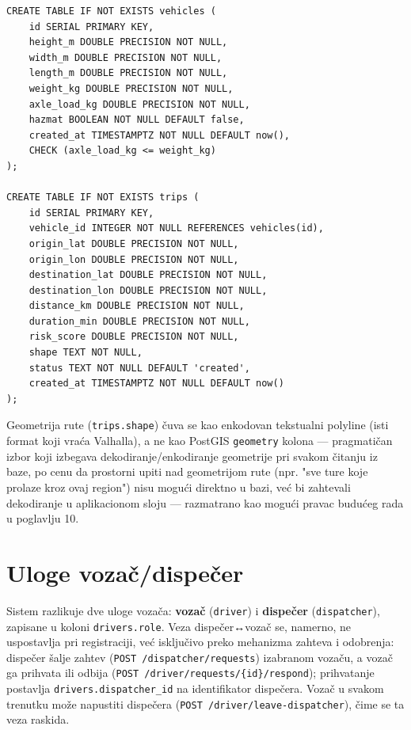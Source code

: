 \newpage
\begin{lstlisting}[caption={[Osnovna šema tabela \texttt{vehicles} i \texttt{trips}]Osnovna šema tabela \texttt{vehicles} i \texttt{trips} (\texttt{00001\_initial\_schema.sql})}]
CREATE TABLE IF NOT EXISTS vehicles (
    id SERIAL PRIMARY KEY,
    height_m DOUBLE PRECISION NOT NULL,
    width_m DOUBLE PRECISION NOT NULL,
    length_m DOUBLE PRECISION NOT NULL,
    weight_kg DOUBLE PRECISION NOT NULL,
    axle_load_kg DOUBLE PRECISION NOT NULL,
    hazmat BOOLEAN NOT NULL DEFAULT false,
    created_at TIMESTAMPTZ NOT NULL DEFAULT now(),
    CHECK (axle_load_kg <= weight_kg)
);

CREATE TABLE IF NOT EXISTS trips (
    id SERIAL PRIMARY KEY,
    vehicle_id INTEGER NOT NULL REFERENCES vehicles(id),
    origin_lat DOUBLE PRECISION NOT NULL,
    origin_lon DOUBLE PRECISION NOT NULL,
    destination_lat DOUBLE PRECISION NOT NULL,
    destination_lon DOUBLE PRECISION NOT NULL,
    distance_km DOUBLE PRECISION NOT NULL,
    duration_min DOUBLE PRECISION NOT NULL,
    risk_score DOUBLE PRECISION NOT NULL,
    shape TEXT NOT NULL,
    status TEXT NOT NULL DEFAULT 'created',
    created_at TIMESTAMPTZ NOT NULL DEFAULT now()
);
\end{lstlisting}

Geometrija rute (\texttt{trips.shape}) čuva se kao enkodovan tekstualni polyline (isti format koji vraća Valhalla), a ne kao PostGIS \texttt{geometry} kolona — pragmatičan izbor koji izbegava dekodiranje/enkodiranje geometrije pri svakom čitanju iz baze, po cenu da prostorni upiti nad geometrijom rute (npr. "sve ture koje prolaze kroz ovaj region") nisu mogući direktno u bazi, već bi zahtevali dekodiranje u aplikacionom sloju — razmatrano kao mogući pravac budućeg rada u poglavlju 10.

\section{Uloge vozač/dispečer}

Sistem razlikuje dve uloge vozača: \textbf{vozač} (\texttt{driver}) i \textbf{dispečer} (\texttt{dispatcher}), zapisane u koloni \texttt{drivers.role}. Veza dispečer↔vozač se, namerno, ne uspostavlja pri registraciji, već isključivo preko mehanizma zahteva i odobrenja: dispečer šalje zahtev (\texttt{POST /dispatcher/requests}) izabranom vozaču, a vozač ga prihvata ili odbija (\texttt{POST /driver/requests/\{id\}/respond}); prihvatanje postavlja \texttt{drivers.dispatcher\_id} na identifikator dispečera. Vozač u svakom trenutku može napustiti dispečera (\texttt{POST /driver/leave-dispatcher}), čime se ta veza raskida.

